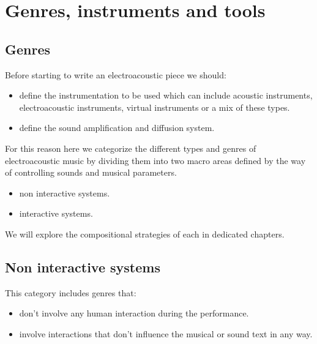 \chapter{Genres, instruments and tools}

\section{Genres}\label{genres}

Before starting to write an electroacoustic piece we should:

\begin{itemize}
\tightlist
\item define the instrumentation to be used which can include acoustic instruments, electroacoustic instruments, virtual instruments or a mix of these types.
\item define the sound amplification and diffusion system.
\end{itemize}


For this reason here we categorize the different types and genres of electroacoustic music by dividing them into two macro areas defined by the way of controlling sounds and musical parameters.

\begin{itemize}
\tightlist
\item non interactive systems.
\item interactive systems.
\end{itemize}

We will explore the compositional strategies of each in dedicated chapters.

\section{Non interactive systems}\label{non-interactive-systems}

This category includes genres that:

\begin{itemize}
\tightlist
\item don't involve any human interaction during the performance.
\item involve interactions that don't influence the musical or sound text in any way.
\end{itemize}

